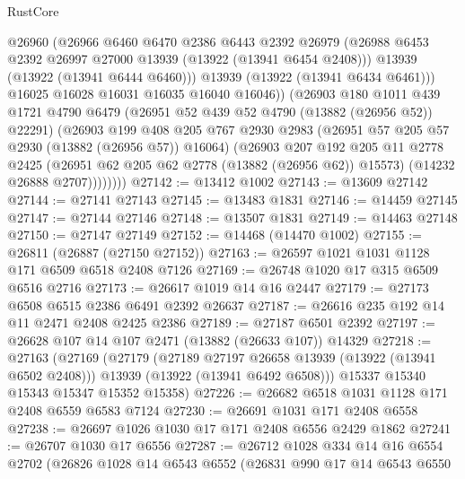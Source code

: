 \begin{lexlean}{RustCore}
\begin{coremodule}
                  @26960
                  (@26966
                    @6460
                    @6470
                    @2386
                    @6443
                    @2392
                    @26979
                    (@26988 @6453 @2392 @26997 @27000 @13939 (@13922 (@13941 @6454 @2408)))
                    @13939
                    (@13922 (@13941 @6444 @6460)))
                  @13939
                  (@13922 (@13941 @6434 @6461)))
                @16025
                @16028
                @16031
                @16035
                @16040
                @16046))
            (@26903
              @180
              @1011
              @439
              @1721
              @4790
              @6479
              (@26951 @52 @439 @52 @4790 (@13882 (@26956 @52)) @22291)
              (@26903
                @199
                @408
                @205
                @767
                @2930
                @2983
                (@26951 @57 @205 @57 @2930 (@13882 (@26956 @57)) @16064)
                (@26903
                  @207
                  @192
                  @205
                  @11
                  @2778
                  @2425
                  (@26951 @62 @205 @62 @2778 (@13882 (@26956 @62)) @15573)
                  (@14232 @26888 @2707))))))))
@27142 := @13412 @1002
@27143 := @13609 @27142
@27144 := @27141 @27143
@27145 := @13483 @1831
@27146 := @14459 @27145
@27147 := @27144 @27146
@27148 := @13507 @1831
@27149 := @14463 @27148
@27150 := @27147 @27149
@27152 := @14468 (@14470 @1002)
@27155 := @26811 (@26887 (@27150 @27152))
@27163 := @26597 @1021 @1031 @1128 @171 @6509 @6518 @2408 @7126
@27169 := @26748 @1020 @17 @315 @6509 @6516 @2716
@27173 := @26617 @1019 @14 @16 @2447
@27179 := @27173 @6508 @6515 @2386 @6491 @2392 @26637
@27187 := @26616 @235 @192 @14 @11 @2471 @2408 @2425 @2386
@27189 := @27187 @6501 @2392
@27197 := @26628 @107 @14 @107 @2471 (@13882 (@26633 @107)) @14329
@27218 := @27163
    (@27169
      (@27179
        (@27189 @27197 @26658 @13939 (@13922 (@13941 @6502 @2408)))
        @13939
        (@13922 (@13941 @6492 @6508)))
      @15337
      @15340
      @15343
      @15347
      @15352
      @15358)
@27226 := @26682 @6518 @1031 @1128 @171 @2408 @6559 @6583 @7124
@27230 := @26691 @1031 @171 @2408 @6558
@27238 := @26697 @1026 @1030 @17 @171 @2408 @6556 @2429 @1862
@27241 := @26707 @1030 @17 @6556
@27287 := @26712
    @1028
    @334
    @14
    @16
    @6554
    @2702
    (@26826
      @1028
      @14
      @6543
      @6552
      (@26831
        @990
        @17
        @14
        @6543
        @6550

\end{coremodule}
\end{lexlean}
